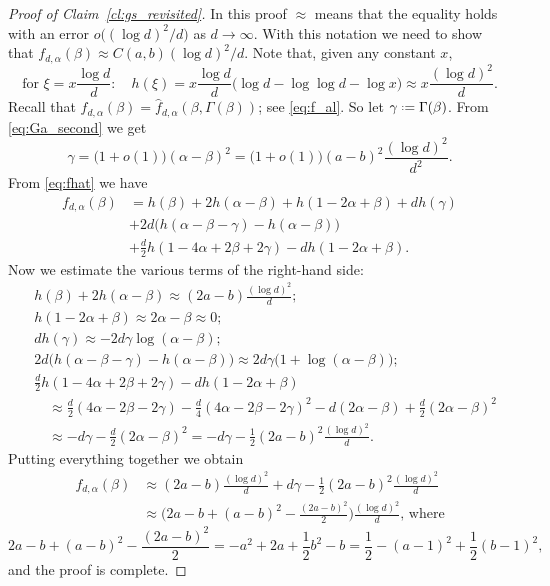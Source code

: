 \documentclass[12pt]{amsart}
\theoremstyle{definition}
\newcommand\fhat{\hat{f}}
\newcommand\al{\alpha}
\newcommand\be{\beta}
\newcommand\ga{\gamma}
\newcommand\Ga{\Gamma}
\newcommand{\defeq}{\mathrel{\vcenter{\baselineskip0.5ex \lineskiplimit0pt
                     \hbox{\scriptsize.}\hbox{\scriptsize.}}}%
                     =}
\begin{document}
\begin{proof}[Proof of Claim~\ref{cl:gs_revisited}]
In this proof $\approx$ means that the equality holds with an error $o\big( (\log d)^2 / d \big)$ as $d \to \infty$. With this notation we need to show that $f_{d,\al}(\be) \approx C(a,b) (\log d)^2/d$. Note that, given any constant $x$, 
%
\[ \text{for }
\xi = x \frac{\log d}{d} : \quad
h(\xi) = x \frac{\log d}{d} 
\big( \log d - \log\log d - \log x \big) 
\approx x \frac{(\log d)^2}{d} .\]
%
Recall that $f_{d,\al}(\be)= \fhat_{d,\al}(\be, \Ga(\be))$; see \eqref{eq:f_al}. So let $\ga \defeq \Ga(\be)$. From \eqref{eq:Ga_second} we get 
%
\[ \ga 
= \big( 1+o(1) \big) (\al-\be)^2 
= \big( 1+o(1) \big) (a-b)^2 \frac{(\log d)^2}{d^2} .\]
%
From \eqref{eq:fhat} we have 
%
\begin{align*}
f_{d,\al}(\be) 
&= h(\be)+2h(\al-\be)+h(1-2\al+\be) + d h(\ga) \\
&+ 2d\bigg( h(\al-\be-\ga) - h(\al-\be) \bigg) \\
&+ \frac{d}{2} h(1-4\al+2\be+2\ga) - dh(1-2\al+\be) .
\end{align*}
%
Now we estimate the various terms of the right-hand side: 
%
\begin{align*}
& h(\be)+2h(\al-\be) \approx (2a-b) \frac{(\log d)^2}{d} ;\\
& h(1-2\al+\be) \approx 2\al-\be \approx 0 ;\\
& d h(\ga) \approx -2d \ga \log(\al-\be) ;\\
& 2d\bigg( h(\al-\be-\ga) - h(\al-\be) \bigg)
\approx 2d\ga \big( 1 + \log(\al-\be) \big) ;\\
& \frac{d}{2} h(1-4\al+2\be+2\ga) - dh(1-2\al+\be) \\ 
&\quad \approx 
\frac{d}{2} (4\al-2\be-2\ga) 
-\frac{d}{4} (4\al-2\be-2\ga)^2 
-d (2\al-\be)
+ \frac{d}{2} (2\al-\be)^2 \\
&\quad \approx 
-d\ga - \frac{d}{2} (2\al-\be)^2 
= -d\ga - \frac{1}{2} (2a-b)^2 \frac{(\log d)^2}{d} .
\end{align*} 
% 
Putting everything together we obtain 
%
\begin{align*}
f_{d,\al}(\be) &\approx 
(2a-b) \frac{(\log d)^2}{d} + d\ga 
- \frac{1}{2} (2a-b)^2 \frac{(\log d)^2}{d} \\
&\approx \bigg( 2a-b + (a-b)^2 - \frac{(2a-b)^2}{2} \bigg) 
\frac{(\log d)^2}{d} \text{, where}
\end{align*}
%
%
\[ 2a-b + (a-b)^2 - \frac{(2a-b)^2}{2} 
= -a^2+2a +\frac 12 b^2-b 
= \frac 12 - (a-1)^2 + \frac 12 (b-1)^2 ,\]
%
and the proof is complete. 
\end{proof}
%
\end{document}
